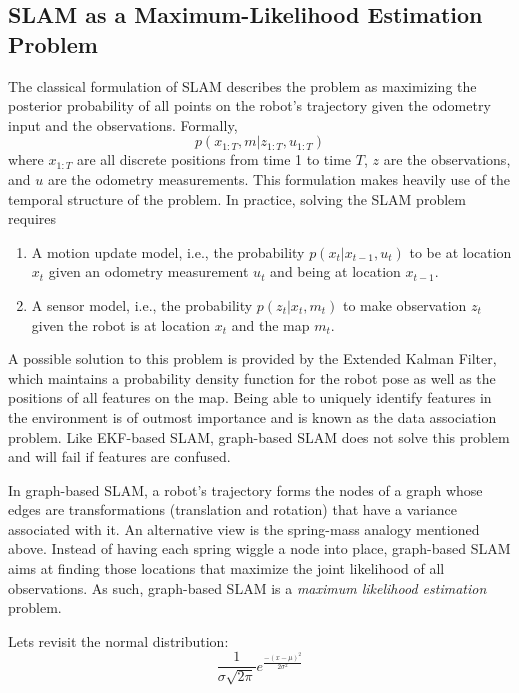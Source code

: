 \subsection{SLAM as a Maximum-Likelihood Estimation Problem}
The classical formulation of SLAM describes the problem as maximizing the posterior probability of all points on the robot's trajectory given the odometry input and the observations. Formally,
\begin{equation}
p(x_{1:T},m|z_{1:T},u_{1:T})
\end{equation}
where $ x_{1:T}$ are all discrete positions from time 1 to time $ T$, $ z$ are the observations, and $ u$ are the odometry measurements. This formulation makes heavily use of the temporal structure of the problem. In practice, solving the SLAM problem requires
\begin{enumerate}
\item A motion update model, i.e., the probability $ p(x_t|x_{t-1},u_t)$ to be at location $ x_t$ given an odometry measurement $ u_t$ and being at location $ x_{t-1}$.
\item  A sensor model, i.e., the probability $ p(z_t|x_t,m_t)$ to make observation $ z_t$ given the robot is at location $ x_t$ and the map $ m_t$.
\end{enumerate}
A possible solution to this problem is provided by the Extended Kalman Filter, which maintains a probability density function for the robot pose as well as the positions of all features on the map. Being able to uniquely identify features in the environment is of outmost importance and is known as the data association problem. Like EKF-based SLAM, graph-based SLAM does not solve this problem and will fail if features are confused.

In graph-based SLAM, a robot's trajectory forms the nodes of a graph whose edges are transformations (translation and rotation) that have a variance associated with it. An alternative view is the spring-mass analogy mentioned above. Instead of having each spring wiggle a node into place, graph-based SLAM aims at finding those locations that maximize the joint likelihood of all observations. As such, graph-based SLAM is a \emph{maximum likelihood estimation} problem.

Lets revisit the normal distribution:
\begin{equation}
\frac{1}{\sigma\sqrt{2\pi}}e^{\frac{-(x-\mu)^2}{2\sigma^2}}
\end{equation}

